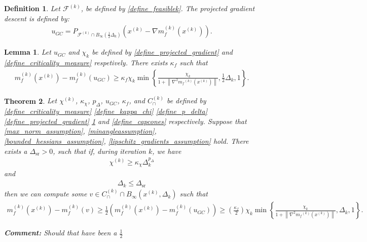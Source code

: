 \documentclass{article}
\newenvironment{comment}
  {\par\medskip
   \color{red}%
   \begin{framed}
   \textbf{Comment: }\ignorespaces}
 {\end{framed}
  \medskip}
\newtheorem{theorem}{Theorem}[section]
\newtheorem{definition}{Definition}[theorem]
\newtheorem{lemma}[theorem]{Lemma}
\theoremstyle{case}
\numberwithin{theorem}{subsection}
\newcommand{\capcones}{{C^{(k)}_{\cap}}}
\newcommand{\chik}{{\chi^{(k)}}}
\newcommand{\dk}{\Delta_k}
\newcommand{\dsr}{{\Delta_{\textrm{sr}}}}
\newcommand{\feasiblek}{{\mathcal F^{(k)}}}
\newcommand{\gk}{{\nabla m_f^{(k)}\left(x^{(k)}\right)}}
\newcommand{\mfk}{{{m}_f}^{(k)}}
\newcommand{\tr}{{ B_{\infty}\left(\xk, \dk\right) }}
\newcommand{\xk}{{x^{(k)}}}
\begin{document}
\begin{definition}
Let $\feasiblek$, be defined by \cref{define_feasiblek}.
The projected gradient descent is defined by:
\begin{align}
u_{GC} = P_{\feasiblek\cap B_{\infty}\left(\frac 1 2 \dk\right)}\left(\xk-\gk\right) \label{define_projected_gradient}.
\end{align}
\end{definition}

\begin{lemma}
\label{sufficient_reduction_of_projected_gradient}
Let 
$u_{GC}$ and $\chi_k$
be defined by
\cref{define_projected_gradient} and \cref{define_criticality_measure}
respetively.
There exists $\kappa_{f}$ such that
\begin{align*}
m_f^{(k)}(\xk) - m_f^{(k)}(u_{GC}) \ge \kappa_f\chi_k \min\left\{ \frac{\chi_k}{1+\left\|\nabla^2 \mfk(\xk)\right\|}, \frac 1 2 \dk, 1 \right\}.
\end{align*}
\end{lemma}




\begin{theorem}
\label{sufficient_reduction_theorem}
Let 
$\chik$,
$\kappa_{\chi}$,
$p_{\Delta}$,
$u_{GC}$,
$\kappa_f$,
and $\capcones$
be defined by
\cref{define_criticality_measure}
\cref{define_kappa_chi}
\cref{define_p_delta}
\cref{define_projected_gradient}
\cref{sufficient_reduction_of_projected_gradient}
and \cref{define_capcones}
respectively.
Suppose that
\cref{max_norm_assumption},
\cref{minangleassumption},
\cref{bounded_hessians_assumption},
\cref{lipschitz_gradients_assumption}
hold.
There exists a $\dsr > 0$, such that if, during iteration $k$, we have
\begin{align}
\chik \ge \kappa_{\chi} \dk^{p_{\Delta}} \label{sr_chi_big_enough}
\end{align}
and
\begin{align}
\dk \le \dsr \label{sr_delta_small_enough}
\end{align}
then we can compute some $v \in \capcones \cap \tr$ such that
\begin{align*}
m_f^{(k)}(\xk) - m_f^{(k)}(v) \ge \frac 1 2 \left(m_f^{(k)}(\xk) - m_f^{(k)}(u_{GC})\right) \ge \left(\frac{\kappa_f}{2} \right)\chi_k \min\left\{ \frac{\chi_k}{1+\left\|\nabla^2 \mfk(\xk)\right\|}, \dk, 1 \right\}.
\end{align*}

\begin{comment}
Should that have been a $\frac 1 2$
\end{comment}

\end{theorem}
\end{document}
